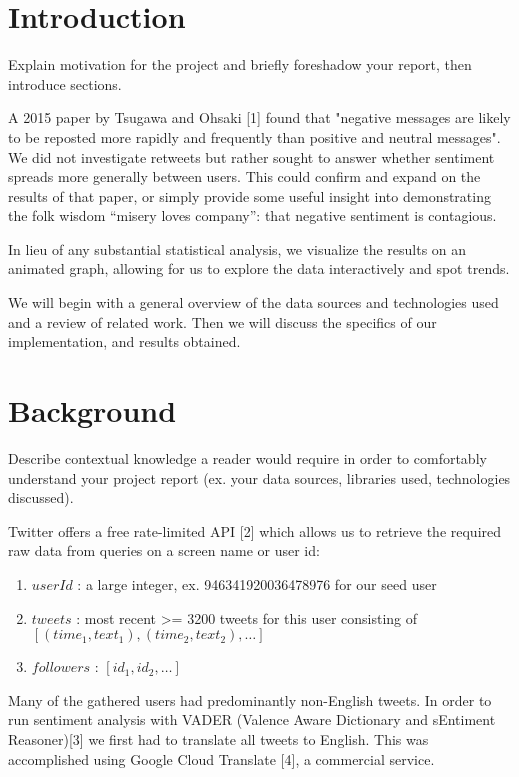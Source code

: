 \documentclass[12pt]{article}
\begin{document}
\section{Introduction}
Explain motivation for the project and briefly foreshadow your report, then introduce sections.\newline

A 2015 paper by Tsugawa and Ohsaki [1] found that "negative messages are likely to be reposted more rapidly and frequently than positive and neutral messages". We did not investigate retweets but rather sought to answer whether sentiment spreads more generally between users. This could confirm and expand on the results of that paper, or simply provide some useful insight into demonstrating the folk wisdom “misery loves company”: that negative sentiment is contagious.\newline

In lieu of any substantial statistical analysis, we visualize the results on an animated graph, allowing for us to explore the data interactively and spot trends.\newline

We will begin with a general overview of the data sources and technologies used and a review of related work. Then we will discuss the specifics of our implementation, and results obtained.


\section{Background}
Describe contextual knowledge a reader would require in order to comfortably understand your project report (ex. your data sources, libraries used, technologies discussed).

Twitter offers a free rate-limited API [2] which allows us to retrieve the required raw data from queries on a screen name or user id:
\begin{enumerate}
    \item $userId$ : a large integer, ex. 946341920036478976 for our seed user
    \item $tweets$ : most recent >= 3200 tweets for this user consisting of $[(time_1, text_1), (time_2, text_2), \dots]$ 
    \item $followers$ : $[id_1, id_2, \dots]$
\end{enumerate}

Many of the gathered users had predominantly non-English tweets. In order to run sentiment analysis with VADER (Valence Aware Dictionary and sEntiment Reasoner)[3] we first had to translate all tweets to English. This was accomplished using Google Cloud Translate [4], a commercial service.\newline
\end{document}
